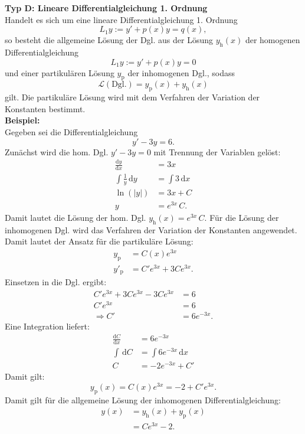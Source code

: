 \noindent
\textbf{Typ D: Lineare Differentialgleichung 1. Ordnung}\\
Handelt es sich um eine lineare Differentialgleichung 1. Ordnung
$$
L_1 y:= y' +p(x)y = q(x),
$$
so besteht die allgemeine L\"osung der Dgl. aus der L\"osung $y_{\text{h}}(x)$ der homogenen Differentialgleichung
$$
L_1 y := y' +p(x)y = 0
$$
und einer partikul\"aren L\"osung $y_{\text{p}}$ der inhomogenen Dgl.,
sodass
$$
\mathcal{L}(\text{Dgl.}) = y_{\text{p}}(x) + y_{\text{h}}(x)
$$
gilt. Die partikul\"are L\"osung wird mit dem Verfahren der Variation der Konstanten bestimmt.\\

\noindent
\textbf{Beispiel:} \\
Gegeben sei die Differentialgleichung
$$
y'-3y=6.
$$
Zun\"achst wird die hom. Dgl. $y'-3y=0$ mit Trennung der Variablen gel\"ost:
\begin{align*}
\frac{\mathrm{d}y}{\mathrm{d}x} &= 3x \\
\int \frac{1}{y} \, \mathrm{d}y &= \int 3 \, \mathrm{d}x \\
\ln(|y|) &= 3x+C \\
y &= e^{3x} \, C.
\end{align*}
Damit lautet die L\"osung der hom. Dgl. $y_{\text{h}}(x)= e^{3x} \, C$.
F\"ur die L\"osung der inhomogenen Dgl. wird das Verfahren der Variation der Konstanten angewendet. Damit lautet der Ansatz f\"ur die partikul\"are L\"osung:
\begin{align*}
y_{\text{p}} &= C(x) e^{3x} \\
y'_{\text{p}} &= C' e^{3x} + 3 C e^{3x}.
\end{align*}
Einsetzen in die Dgl. ergibt:
\begin{align*}
C' e^{3x} + 3 C e^{3x} - 3Ce^{3x}  &= 6 \\
C' e^{3x} &= 6 \\
\Rightarrow C' &= 6 e^{-3x}. 
\end{align*}
Eine Integration liefert:
\begin{align*}
\frac{\mathrm{d}C}{\mathrm{d}x} &= 6 e^{-3x} \\
\int  \, \mathrm{d}C &= \int 6 e^{-3x} \, \mathrm{d}x \\
C &= -2 e^{-3x} + C'
\end{align*}
Damit gilt:
$$
y_{\text{p}}(x) = C(x) e^{3x} = -2 + C' e^{3x}.
$$
Damit gilt f\"ur die allgemeine L\"osung der inhomogenen Differentialgleichung:
\begin{align*}
y(x) &=  y_{\text{h}}(x) + y_{\text{p}}(x)\\
     &= C e^{3x} -2.
\end{align*}

